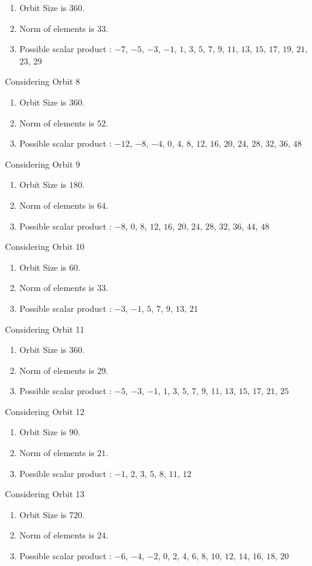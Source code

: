 \documentclass[12pt]{article}
\begin{document}
\begin{enumerate}
\item Orbit Size is $360$.
\item Norm of elements is $33$.
\item Possible scalar product : $-7$, $-5$, $-3$, $-1$, $1$, $3$, $5$, $7$, $9$, $11$, $13$, $15$, $17$, $19$, $21$, $23$, $29$
\end{enumerate}
Considering Orbit 8
\begin{enumerate}
\item Orbit Size is $360$.
\item Norm of elements is $52$.
\item Possible scalar product : $-12$, $-8$, $-4$, $0$, $4$, $8$, $12$, $16$, $20$, $24$, $28$, $32$, $36$, $48$
\end{enumerate}
Considering Orbit 9
\begin{enumerate}
\item Orbit Size is $180$.
\item Norm of elements is $64$.
\item Possible scalar product : $-8$, $0$, $8$, $12$, $16$, $20$, $24$, $28$, $32$, $36$, $44$, $48$
\end{enumerate}
Considering Orbit 10
\begin{enumerate}
\item Orbit Size is $60$.
\item Norm of elements is $33$.
\item Possible scalar product : $-3$, $-1$, $5$, $7$, $9$, $13$, $21$
\end{enumerate}
Considering Orbit 11
\begin{enumerate}
\item Orbit Size is $360$.
\item Norm of elements is $29$.
\item Possible scalar product : $-5$, $-3$, $-1$, $1$, $3$, $5$, $7$, $9$, $11$, $13$, $15$, $17$, $21$, $25$
\end{enumerate}
Considering Orbit 12
\begin{enumerate}
\item Orbit Size is $90$.
\item Norm of elements is $21$.
\item Possible scalar product : $-1$, $2$, $3$, $5$, $8$, $11$, $12$
\end{enumerate}
Considering Orbit 13
\begin{enumerate}
\item Orbit Size is $720$.
\item Norm of elements is $24$.
\item Possible scalar product : $-6$, $-4$, $-2$, $0$, $2$, $4$, $6$, $8$, $10$, $12$, $14$, $16$, $18$, $20$
\end{enumerate}
\end{document}
